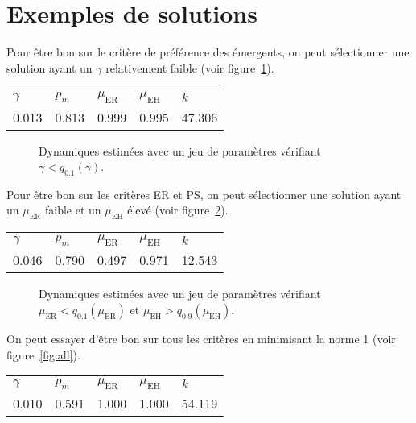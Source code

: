 \documentclass[a4paper, 11pt]{article}
\begin{document}
\section{Exemples de solutions}

Pour être bon sur le critère de préférence des émergents, on peut sélectionner une solution ayant un $\gamma$ relativement faible (voir figure~\ref{fig:emer}). 

\begin{center}
\begin{tabular}{lllll}
$\gamma$ & $p_m$ & $\mu_{\text{ER}}$ & $\mu_{\text{EH}}$ & $k$\\
0.013 & 0.813 & 0.999 & 0.995 & 47.306
\end{tabular}
\end{center}


\begin{figure}[ht]
 \centering
  
 \caption{Dynamiques estimées avec un jeu de paramètres vérifiant $\gamma < q_{0.1}\left( \gamma \right)$.}
 
 \label{fig:emer}
\end{figure}

Pour être bon sur les critères ER et PS, on peut sélectionner une solution ayant un $\mu_{\text{ER}}$ faible et un $\mu_{\text{EH}}$ élevé (voir figure~\ref{fig:erps}). 

\begin{center}
\begin{tabular}{lllll}
$\gamma$ & $p_m$ & $\mu_{\text{ER}}$ & $\mu_{\text{EH}}$ & $k$\\
0.046 & 0.790 & 0.497 & 0.971 & 12.543
\end{tabular}
\end{center}


\begin{figure}[ht]
 \centering
  
 \caption{Dynamiques estimées avec un jeu de paramètres vérifiant $\mu_{\text{ER}} < q_{0.1}\left( \mu_{\text{ER}} \right)$ et $\mu_{\text{EH}} > q_{0.9}\left( \mu_{\text{EH}} \right)$.}
 
 \label{fig:erps}
\end{figure}

\newpage
On peut essayer d'être bon sur tous les critères en minimisant la norme 1 (voir figure~\ref{fig:all}).

\begin{center}
\begin{tabular}{lllll}
$\gamma$ & $p_m$ & $\mu_{\text{ER}}$ & $\mu_{\text{EH}}$ & $k$\\
0.010 & 0.591 & 1.000 & 1.000 & 54.119
\end{tabular}
\end{center}
\end{document}
